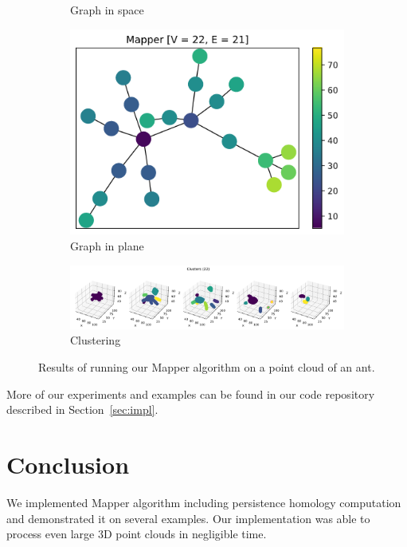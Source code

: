 \documentclass{article}
\begin{document}
\begin{figure}[ht]
\begin{subfigure}[c]{0.3\columnwidth}
        \caption{Graph in space}
        \label{fig:ant-space}
    \end{subfigure}
    \begin{subfigure}[c]{0.3\columnwidth}
        \centering
        \includegraphics[width=\textwidth]{ant-graph-2d}
        \caption{Graph in plane}
        \label{fig:ant-plane}
    \end{subfigure}
    \begin{subfigure}[c]{0.9\columnwidth}
        \centering
        \includegraphics[width=\textwidth]{ant-clusters}
        \caption{Clustering}
        \label{fig:ant-cluster}
    \end{subfigure}
    \caption{Results of running our Mapper algorithm on a point cloud of an ant.}
    \label{fig:ant}
\end{figure}

More of our experiments and examples can be found in our code repository described in Section~\ref{sec:impl}.

\section{Conclusion}\label{sec:concl}

We implemented Mapper algorithm including persistence homology computation and demonstrated it on several examples.
Our implementation was able to process even large 3D point clouds in negligible time.
\end{document}
